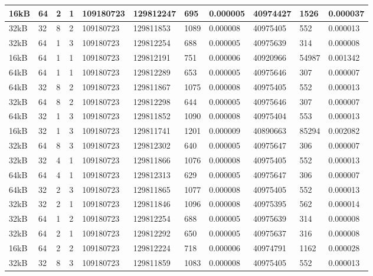 \documentclass[conference]{IEEEtran}
\begin{document}
\begin{table}
\begin{tabular}{|m{.75cm} |m{.75cm} |m{.8cm} | m{.75cm} | l | l | l | l | l | l | l |}
16kB&	64&	2&	1&	109180723&	129812247&	695	&  0.000005&	40974427&	1526	&0.000037 \\ \hline
32kB&	32&	8&	2&	109180723&	129811853&	1089&	0.000008	&40975405	  &552	  &0.000013 \\ \hline
32kB&	64&	1&	3&	109180723&	129812254&	688	&  0.000005&	40975639	&314	  &0.000008 \\ \hline
16kB&	64&	1&	1&	109180723&	129812191&	751	&  0.000006&	40920966	&54987	&0.001342 \\ \hline
64kB&	64&	1&	1&	109180723&	129812289&	653	&  0.000005&	40975646	&307   &0.000007 \\ \hline
64kB&	32&	8&	2&	109180723&	129811867&	1075&	0.000008	&40975405	  &552   &0.000013 \\ \hline
32kB&	64&	8&	2&	109180723&	129812298&	644	&  0.000005&	40975646	&307   &0.000007 \\ \hline
64kB&	32&	1&	3&	109180723&	129811852&	1090&	0.000008	&40975404	  &553   &0.000013 \\ \hline
16kB&	32&	1&	3&	109180723&	129811741&	1201&	0.000009	&40890663	  &85294	&0.002082 \\ \hline
32kB&	64&	8&	3&	109180723&	129812302&	640	&  0.000005&	40975647	&306	  &0.000007 \\ \hline
32kB&	32&	4&	1&	109180723&	129811866&	1076&	0.000008	&40975405	  &552	  &0.000013 \\ \hline
64kB&	64&	4&	1&	109180723&	129812313&	629	&  0.000005&	40975647	&306	  &0.000007 \\ \hline
64kB&	32&	2&	3&	109180723&	129811865&	1077&	0.000008	&40975405	  &552	  &0.000013 \\ \hline
32kB&	32&	2&	1&	109180723&	129811846&	1096&	0.000008	&40975395	  &562	  &0.000014 \\ \hline
32kB&	64&	1&	2&	109180723&	129812254&	688	&  0.000005&	40975639	&314	  &0.000008 \\ \hline
32kB&	64&	2&	1&	109180723&	129812292&	650	&  0.000005&	40975637	&316	  &0.000008 \\ \hline
16kB&	64&	2&	2&	109180723&	129812224&	718	&  0.000006&	40974791&	1162	&0.000028 \\ \hline
32kB&	32&	8&	3&	109180723&	129811859&	1083&	0.000008	&40975405	  &552	  &0.000013 \\ \hline
    \end{tabular}
  \end{table}
\end{document}

